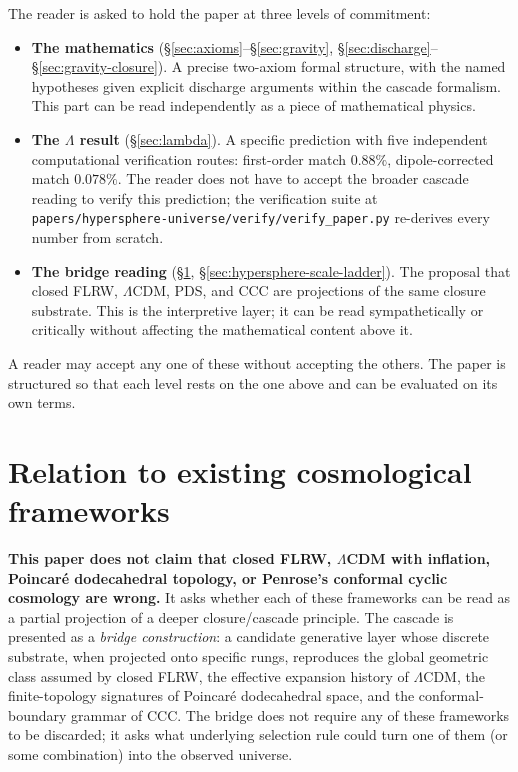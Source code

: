 \documentclass[11pt]{article}
\theoremstyle{plain}
\theoremstyle{definition}
\theoremstyle{remark}
\begin{document}
The reader is asked to hold the paper at three levels of commitment:
\begin{itemize}[leftmargin=2em]
\item \textbf{The mathematics} (\S\ref{sec:axioms}--\S\ref{sec:gravity}, \S\ref{sec:discharge}--\S\ref{sec:gravity-closure}). A precise two-axiom formal structure, with the named hypotheses given explicit discharge arguments within the cascade formalism. This part can be read independently as a piece of mathematical physics.
\item \textbf{The $\Lambda$ result} (\S\ref{sec:lambda}). A specific prediction with five independent computational verification routes: first-order match $0.88\%$, dipole-corrected match $0.078\%$. The reader does not have to accept the broader cascade reading to verify this prediction; the verification suite at \texttt{papers/hypersphere-universe/verify/verify\_paper.py} re-derives every number from scratch.
\item \textbf{The bridge reading} (\S\ref{sec:bridge}, \S\ref{sec:hypersphere-scale-ladder}). The proposal that closed FLRW, $\Lambda$CDM, PDS, and CCC are projections of the same closure substrate. This is the interpretive layer; it can be read sympathetically or critically without affecting the mathematical content above it.
\end{itemize}
A reader may accept any one of these without accepting the others. The paper is structured so that each level rests on the one above and can be evaluated on its own terms.

\section{Relation to existing cosmological frameworks}\label{sec:bridge}

\textbf{This paper does not claim that closed FLRW, $\Lambda$CDM with inflation, Poincar\'e dodecahedral topology, or Penrose's conformal cyclic cosmology are wrong.} It asks whether each of these frameworks can be read as a partial projection of a deeper closure/cascade principle. The cascade is presented as a \emph{bridge construction}: a candidate generative layer whose discrete substrate, when projected onto specific rungs, reproduces the global geometric class assumed by closed FLRW, the effective expansion history of $\Lambda$CDM, the finite-topology signatures of Poincar\'e dodecahedral space, and the conformal-boundary grammar of CCC. The bridge does not require any of these frameworks to be discarded; it asks what underlying selection rule could turn one of them (or some combination) into the observed universe.
\end{document}
